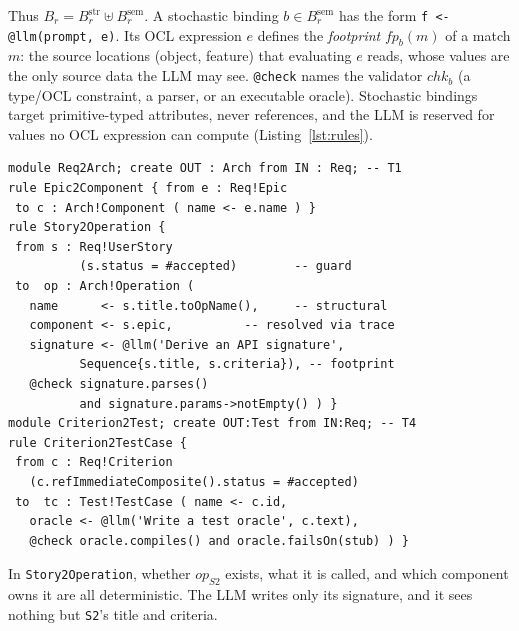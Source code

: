 \documentclass[10pt,conference]{IEEEtran}
\theoremstyle{definition}
\newcommand{\str}{\mathrm{str}}
\newcommand{\sem}{\mathrm{sem}}
\newcommand{\code}[1]{\texttt{#1}}
\newcommand{\fp}{\mathit{fp}}
\begin{document}
\noindent Thus $B_r=B_r^{\str}\uplus B_r^{\sem}$. A stochastic binding $b\in B_r^{\sem}$ has the form
\code{f <- @llm(prompt, e)}. Its OCL expression $e$ defines the
\emph{footprint} $\fp_b(m)$ of a match $m$: the source locations (object,
feature) that evaluating $e$ reads, whose values are the only source data
the LLM may see. \code{@check} names the validator $\mathit{chk}_b$ (a
type/OCL constraint, a parser, or an executable oracle). Stochastic
bindings target primitive-typed attributes, never references, and the LLM
is reserved for values no OCL expression can compute
(Listing~\ref{lst:rules}).

\begin{lstlisting}[language=ATL, float=t,
  caption={Hybrid hand-offs $T_1$ and $T_4$ (\code{@llm}, \code{@check}).},
  label={lst:rules}]
module Req2Arch; create OUT : Arch from IN : Req; -- T1
rule Epic2Component { from e : Req!Epic
 to c : Arch!Component ( name <- e.name ) }
rule Story2Operation {
 from s : Req!UserStory
          (s.status = #accepted)        -- guard
 to  op : Arch!Operation (
   name      <- s.title.toOpName(),     -- structural
   component <- s.epic,          -- resolved via trace
   signature <- @llm('Derive an API signature',
          Sequence{s.title, s.criteria}), -- footprint
   @check signature.parses()
          and signature.params->notEmpty() ) }
module Criterion2Test; create OUT:Test from IN:Req; -- T4
rule Criterion2TestCase {
 from c : Req!Criterion
   (c.refImmediateComposite().status = #accepted)
 to  tc : Test!TestCase ( name <- c.id,
   oracle <- @llm('Write a test oracle', c.text),
   @check oracle.compiles() and oracle.failsOn(stub) ) }
\end{lstlisting}

\noindent In \code{Story2Operation}, whether $\mathit{op}_{S2}$ exists,
what it is called, and which component owns it are all deterministic. The
LLM writes only its signature, and it sees nothing but \code{S2}'s title
and criteria.
\end{document}
